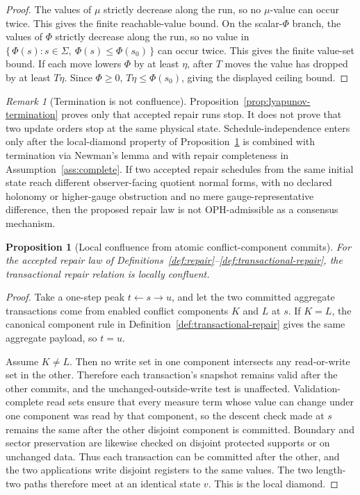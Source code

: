 \documentclass[11pt]{article}
\newtheorem{proposition}[theorem]{Proposition}
\theoremstyle{remark}
\newtheorem{remark}[theorem]{Remark}
\theoremstyle{plain}
\begin{document}
\begin{proof}
The values of \(\mu\) strictly decrease along the run, so no \(\mu\)-value can occur twice. This
gives the finite reachable-value bound. On the scalar-\(\Phi\) branch, the values of \(\Phi\)
strictly decrease along the run, so no value in
\(\{\,\Phi(s):s\in\Sigma,\ \Phi(s)\le \Phi(s_0)\,\}\) can occur twice. This gives the finite
value-set bound. If each move lowers \(\Phi\) by at least \(\eta\), after \(T\) moves the value has
dropped by at least \(T\eta\). Since \(\Phi\ge0\), \(T\eta\le\Phi(s_0)\), giving the displayed
ceiling bound.
\end{proof}

\begin{remark}[Termination is not confluence]\label{rem:termination-not-confluence}
Proposition~\ref{prop:lyapunov-termination} proves only that accepted repair runs stop. It does not
prove that two update orders stop at the same physical state. Schedule-independence enters only after
the local-diamond property of Proposition~\ref{prop:local-confluence} is combined with termination
via Newman's lemma and with repair completeness in Assumption~\ref{ass:complete}. If two accepted
repair schedules from the same initial state reach different observer-facing quotient normal forms,
with no declared holonomy or higher-gauge obstruction and no mere gauge-representative difference,
then the proposed repair law is not OPH-admissible as a consensus mechanism.
\end{remark}

\begin{proposition}[Local confluence from atomic conflict-component commits]\label{prop:local-confluence}
For the accepted repair law of
Definitions~\ref{def:repair}--\ref{def:transactional-repair}, the transactional repair relation
is locally confluent.
\end{proposition}

\begin{proof}
Take a one-step peak \(t\leftarrow s\to u\), and let the two committed aggregate transactions
come from enabled conflict components \(K\) and \(L\) at \(s\). If \(K=L\), the canonical
component rule in Definition~\ref{def:transactional-repair} gives the same aggregate payload, so
\(t=u\).

Assume \(K\ne L\). Then no write set in one component intersects any read-or-write set in the
other. Therefore each transaction's snapshot remains valid after the other commits, and the
unchanged-outside-write test is unaffected. Validation-complete read sets ensure that every
measure term whose value can change under one component was read by that component, so the
descent check made at \(s\) remains the same after the other disjoint component is committed.
Boundary and sector preservation are likewise checked on disjoint protected supports or on
unchanged data. Thus each transaction can be committed after the other, and the two applications
write disjoint registers to the same values. The two length-two paths therefore meet at an
identical state \(v\). This is the local diamond.
\end{proof}
\end{document}
